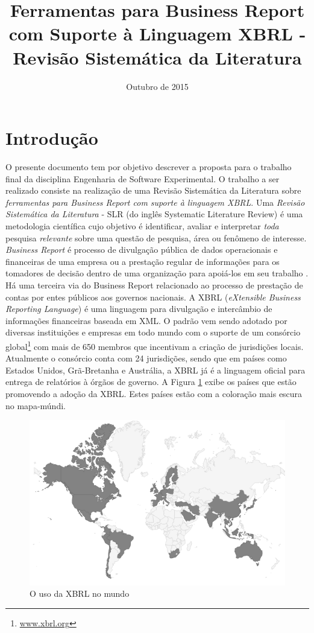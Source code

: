 \documentclass{article}
\title{Ferramentas para Business Report com Suporte à Linguagem XBRL -
  \\Revisão Sistemática da Literatura}
\author{}
\date{Outubro de  2015}
\begin{document}
\maketitle

\section{Introdução}
\label{sec:intro}

O presente documento tem por objetivo descrever a proposta para o
trabalho final da disciplina Engenharia de Software Experimental. O
trabalho a ser realizado consiste na realização de uma Revisão Sistemática da
Literatura sobre \textit{ferramentas para Business Report com suporte à linguagem XBRL}. Uma \textit{Revisão Sistemática da Literatura} - SLR (do inglês Systematic Literature Review) é uma
metodologia científica cujo objetivo é identificar, avaliar e interpretar
\textit{toda} pesquisa \textit{relevante} sobre uma questão de pesquisa, área ou fenômeno de interesse\cite{keele2007guidelines,wohlin2012experimentation}. \textit{Business Report} é processo de divulgação
pública de dados operacionais e financeiras de uma empresa ou a
prestação regular de informações para os tomadores de decisão dentro
de uma organização para apoiá-los em seu trabalho
\cite{lymer1999business}. Há uma terceira via do Business Report
relacionado ao processo de prestação de contas por entes públicos aos
governos nacionais. A XBRL (\textit{eXtensible Business Reporting
  Language}) é uma linguagem para divulgação e intercâmbio de
informações financeiras baseada em
XML\cite{xbrl_conceitos_aplicacoes}. O padrão vem sendo adotado por
diversas instituições e empresas em todo mundo com o suporte de um
consórcio global\footnote{\url{www.xbrl.org}} com mais de 650 membros
que incentivam a criação de jurisdições locais. Atualmente o consórcio
conta com 24 jurisdições, sendo que em países como  Estados Unidos,
Grã-Bretanha e Austrália, a XBRL já é a linguagem oficial para entrega
de relatórios à órgãos de governo. A Figura \ref{fig:world_map} exibe
os países que estão promovendo a adoção da XBRL. Estes países estão
com a coloração mais escura no mapa-múndi.

\begin{figure}[hbtp]
\centering
\includegraphics[width=.75\textwidth]{../img/world-map.png}
\caption{O uso da XBRL no mundo}
\label{fig:world_map}
\end{figure}
\end{document}
